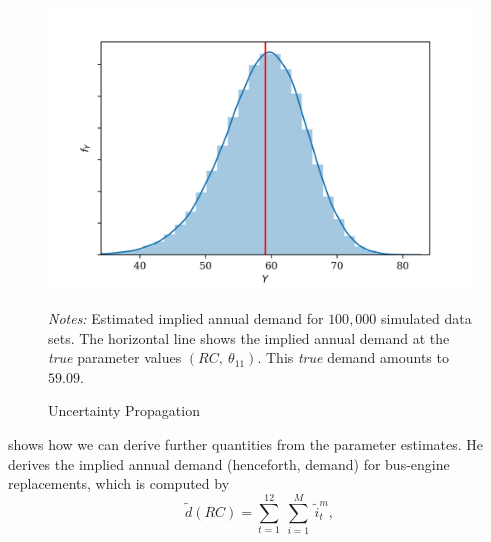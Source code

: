 \begin{figure}[t]
	\caption{Uncertainty Propagation}
    \label{uncertainty}
	\begin{centering}
	\vspace*{-4mm}
	\begin{centering}
		\includegraphics[scale=0.9]{../figures/uncertainty_propagation_100000.png}
	\end{centering}
	\end{centering}

	\small
	\textit{Notes:} Estimated implied annual demand for $100,000$ simulated data sets. The horizontal line shows the implied annual demand at the \textit{true} parameter values $(RC,\ \theta_{11})$. This \textit{true} demand amounts to $59.09$.
\end{figure}

\citet{R87} shows how we can derive further quantities from the parameter estimates. He derives the implied annual demand (henceforth, demand) for bus-engine replacements, which is computed by
\begin{equation}
\tilde{d}(RC)=\sum_{t=1}^{12}\ \sum_{i=1}^{M}\ {\tilde{i}}_t^m,
\end{equation}

